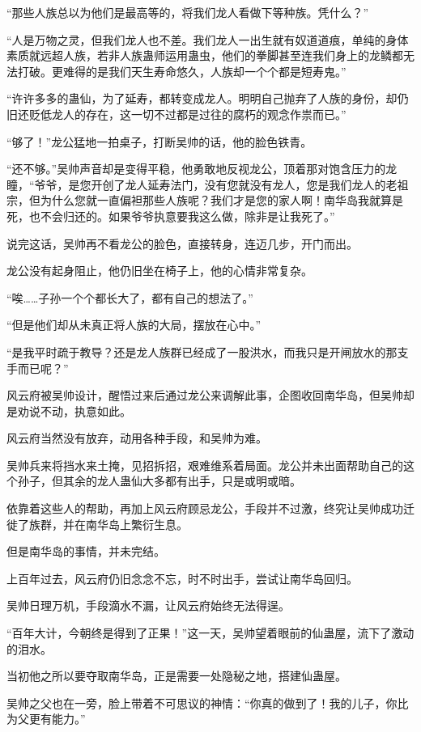 \begin{this_body}
“那些人族总以为他们是最高等的，将我们龙人看做下等种族。凭什么？”

“人是万物之灵，但我们龙人也不差。我们龙人一出生就有奴道道痕，单纯的身体素质就远超人族，若非人族蛊师运用蛊虫，他们的拳脚甚至连我们身上的龙鳞都无法打破。更难得的是我们天生寿命悠久，人族却一个个都是短寿鬼。”

“许许多多的蛊仙，为了延寿，都转变成龙人。明明自己抛弃了人族的身份，却仍旧还贬低龙人的存在，这一切不过都是过往的腐朽的观念作祟而已。”

“够了！”龙公猛地一拍桌子，打断吴帅的话，他的脸色铁青。

“还不够。”吴帅声音却是变得平稳，他勇敢地反视龙公，顶着那对饱含压力的龙瞳，“爷爷，是您开创了龙人延寿法门，没有您就没有龙人，您是我们龙人的老祖宗，但为什么您就一直偏袒那些人族呢？我们才是您的家人啊！南华岛我就算是死，也不会归还的。如果爷爷执意要我这么做，除非是让我死了。”

说完这话，吴帅再不看龙公的脸色，直接转身，连迈几步，开门而出。

龙公没有起身阻止，他仍旧坐在椅子上，他的心情非常复杂。

“唉……子孙一个个都长大了，都有自己的想法了。”

“但是他们却从未真正将人族的大局，摆放在心中。”

“是我平时疏于教导？还是龙人族群已经成了一股洪水，而我只是开闸放水的那支手而已呢？”

风云府被吴帅设计，醒悟过来后通过龙公来调解此事，企图收回南华岛，但吴帅却是劝说不动，执意如此。

风云府当然没有放弃，动用各种手段，和吴帅为难。

吴帅兵来将挡水来土掩，见招拆招，艰难维系着局面。龙公并未出面帮助自己的这个孙子，但其余的龙人蛊仙大多都有出手，只是或明或暗。

依靠着这些人的帮助，再加上风云府顾忌龙公，手段并不过激，终究让吴帅成功迁徙了族群，并在南华岛上繁衍生息。

但是南华岛的事情，并未完结。

上百年过去，风云府仍旧念念不忘，时不时出手，尝试让南华岛回归。

吴帅日理万机，手段滴水不漏，让风云府始终无法得逞。

“百年大计，今朝终是得到了正果！”这一天，吴帅望着眼前的仙蛊屋，流下了激动的泪水。

当初他之所以要夺取南华岛，正是需要一处隐秘之地，搭建仙蛊屋。

吴帅之父也在一旁，脸上带着不可思议的神情：“你真的做到了！我的儿子，你比为父更有能力。”


\end{this_body}
